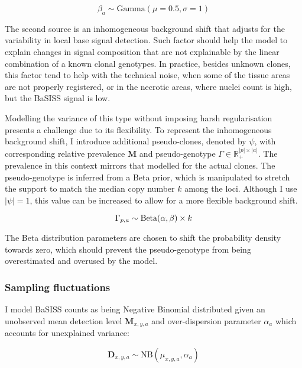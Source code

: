 \begin{equation} 
\beta_{a} \sim \text{Gamma}(\mu=0.5, \sigma=1) 
\end{equation}

The second source is an inhomogeneous background shift that adjusts for the variability in local base signal detection. Such factor should help the model to explain changes in signal composition that are not explainable by the linear combination of a known clonal genotypes. In practice, besides unknown clones, this factor tend to help with the technical noise, when some of the tissue areas are not properly registered, or in the necrotic areas, where nuclei count is high, but the \ac{BaSISS} signal is low.

Modelling the variance of this type without imposing harsh regularisation presents a challenge due to its flexibility. To represent the inhomogeneous background shift, I introduce additional pseudo-clones, denoted by $\psi$, with corresponding relative prevalence $\mathbf{M}$ and pseudo-genotype $\Gamma \in \mathbb{R}^{|p|\times|a|}_{+}$. The prevalence in this context mirrors that modelled for the actual clones. The pseudo-genotype is inferred from a Beta prior, which is manipulated to stretch the support to match the median copy number $k$ among the loci. Although I use $|\psi| = 1$, this value can be increased to allow for a more flexible background shift.

\begin{equation} 
    {\Gamma}_{p,a} \sim \text{Beta}(\alpha, \beta) \times k \\
\end{equation}

The Beta distribution parameters are chosen to shift the probability density towards zero, which should prevent the pseudo-genotype from being overestimated and overused by the model.

\subsubsection*{Sampling fluctuations}
I model \ac{BaSISS} counts as being Negative Binomial distributed given an unobserved mean detection level $\mathbf{M}_{x,y,a}$ and over-dispersion parameter ${\alpha}_a$ which accounts for unexplained variance:

\begin{equation} 
\mathbf{D}_{x,y,a} \sim \text{NB}(\mu_{x,y,a}, \alpha_a)
\end{equation}

